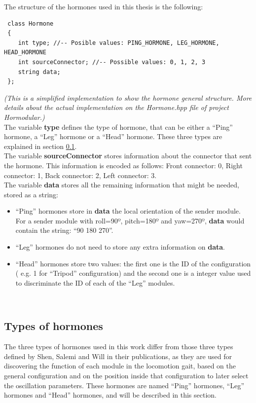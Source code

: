 The structure of the hormones used in this thesis is the following:
\Cpp
\begin{lstlisting}
 class Hormone 
 {
 	int type; //-- Posible values: PING_HORMONE, LEG_HORMONE, HEAD_HORMONE
 	int sourceConnector; //-- Possible values: 0, 1, 2, 3
 	string data;
 };
\end{lstlisting}
\noindent \textit{  (This is a simplified implementation to show the hormone general structure. More details about the actual implementation on the Hormone.hpp file of project Hormodular.)}\\

The variable \textbf{type} defines the type of hormone, that can be either a ``Ping'' hormone, a ``Leg'' hormone or a ``Head'' hormone. These three types are explained in section \ref{hormone_types}.\\

The variable \textbf{sourceConnector} stores information about the connector that sent the hormone. This information is encoded as follows: Front connector: 0, Right connector: 1, Back connector: 2, Left connector: 3.\\

The variable \textbf{data} stores all the remaining information that might be needed, stored as a string:
\begin{itemize}
	\item ``Ping'' hormones store in \textbf{data} the local orientation of the sender module. For a sender module with roll=90º, pitch=180º and yaw=270º, \textbf{data} would contain the string: ``90 180 270''.
	
	\item ``Leg'' hormones do not need to store any extra information on \textbf{data}.
	
	\item ``Head'' hormones store two values: the first one is the ID of the configuration ( e.g. 1 for ``Tripod'' configuration) and the second one is a integer value used to discriminate the ID of each of the ``Leg'' modules.
\end{itemize}
~\\

\subsection{Types of hormones}
\label{hormone_types}
The three types of hormones used in this work differ from those three types defined by Shen, Salemi and Will in their publications, as they are used for discovering the function of each module in the locomotion gait, based on the general configuration and on the position inside that configuration to later select the oscillation parameters. These hormones are named ``Ping'' hormones, ``Leg'' hormones and ``Head'' hormones, and will be described in this section.\\

